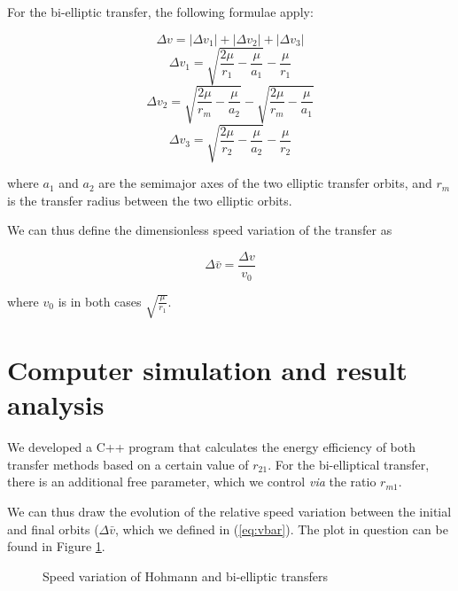 \documentclass[journal]{IEEEtran}
\begin{document}
For the bi-elliptic transfer, the following formulae apply:

\begin{equation}
    \Delta v  = \left|\Delta v_1 \right| + \left| \Delta v_2 \right| + \left| \Delta v_3 \right|
\end{equation}
\begin{equation}
    \Delta v_1 = \sqrt{\frac{2\mu}{r_1}-\frac{\mu}{a_1}}-\frac{\mu}{r_1}
\end{equation}
\begin{equation}
    \Delta v_2 = \sqrt{\frac{2\mu}{r_m}-\frac{\mu}{a_2}} - \sqrt{\frac{2\mu}{r_m}-\frac{\mu}{a_1}}
\end{equation}
\begin{equation}
    \Delta v_3 = \sqrt{\frac{2\mu}{r_2}-\frac{\mu}{a_2}}-\frac{\mu}{r_2}
\end{equation}

where $a_1$ and $a_2$ are the semimajor axes of the two elliptic transfer orbits, and $r_m$ is the transfer radius between the two elliptic orbits.

We can thus define the dimensionless speed variation of the transfer as

\begin{equation}
    \Delta \bar{v} = \frac{\Delta v}{v_0}
    \label{eq:vbar}
\end{equation}

where $v_0$ is in both cases $\sqrt{\frac{\mu}{r_1}}$.

\section*{Computer simulation and result analysis}

We developed a C++ program\cite{git_program} that calculates the energy efficiency of both transfer methods based on a certain value of $r_{21}$. For the bi-elliptical transfer, there is an additional free parameter, which we control \textit{via} the ratio $r_{m1}$.

We can thus draw the evolution of the relative speed variation between the initial and final orbits ($\Delta \bar{v}$, which we defined in (\ref{eq:vbar}). The plot in question can be found in Figure \ref{plot:vbar}.


\begin{figure}[htp!]
  \centering
  
  \caption{Speed variation of Hohmann and bi-elliptic transfers}
  \label{plot:vbar}
\end{figure}
\end{document}
